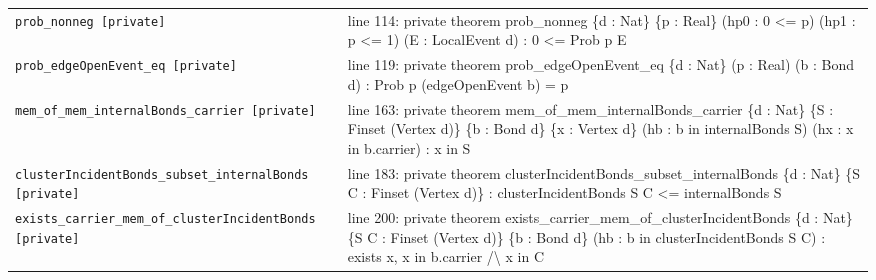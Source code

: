 \documentclass[10pt]{article}
\begin{document}
\begin{longtable}{>{\raggedright\arraybackslash}p{} >{\raggedright\arraybackslash}p{}}
\texttt{prob\_\allowbreak{}nonneg [private]} & {\ttfamily\scriptsize line 114:\allowbreak{} private theorem prob\_\allowbreak{}nonneg \{d :\allowbreak{} Nat\} \{p :\allowbreak{} Real\} (\allowbreak{}hp0 :\allowbreak{} 0 <=\allowbreak{} p)\allowbreak{} (\allowbreak{}hp1 :\allowbreak{} p <=\allowbreak{} 1)\allowbreak{} (\allowbreak{}E :\allowbreak{} LocalEvent d)\allowbreak{} :\allowbreak{} 0 <=\allowbreak{} Prob p E} \\[0.45em]
\texttt{prob\_\allowbreak{}edgeOpenEvent\_\allowbreak{}eq [private]} & {\ttfamily\scriptsize line 119:\allowbreak{} private theorem prob\_\allowbreak{}edgeOpenEvent\_\allowbreak{}eq \{d :\allowbreak{} Nat\} (\allowbreak{}p :\allowbreak{} Real)\allowbreak{} (\allowbreak{}b :\allowbreak{} Bond d)\allowbreak{} :\allowbreak{} Prob p (\allowbreak{}edgeOpenEvent b)\allowbreak{} =\allowbreak{} p} \\[0.45em]
\texttt{mem\_\allowbreak{}of\_\allowbreak{}mem\_\allowbreak{}internalBonds\_\allowbreak{}carrier [private]} & {\ttfamily\scriptsize line 163:\allowbreak{} private theorem mem\_\allowbreak{}of\_\allowbreak{}mem\_\allowbreak{}internalBonds\_\allowbreak{}carrier \{d :\allowbreak{} Nat\} \{S :\allowbreak{} Finset (\allowbreak{}Vertex d)\allowbreak{}\} \{b :\allowbreak{} Bond d\} \{x :\allowbreak{} Vertex d\} (\allowbreak{}hb :\allowbreak{} b in internalBonds S)\allowbreak{} (\allowbreak{}hx :\allowbreak{} x in b.\allowbreak{}carrier)\allowbreak{} :\allowbreak{} x in S} \\[0.45em]
\texttt{clusterIncidentBonds\_\allowbreak{}subset\_\allowbreak{}internalBonds [private]} & {\ttfamily\scriptsize line 183:\allowbreak{} private theorem clusterIncidentBonds\_\allowbreak{}subset\_\allowbreak{}internalBonds \{d :\allowbreak{} Nat\} \{S C :\allowbreak{} Finset (\allowbreak{}Vertex d)\allowbreak{}\} :\allowbreak{} clusterIncidentBonds S C <=\allowbreak{} internalBonds S} \\[0.45em]
\texttt{exists\_\allowbreak{}carrier\_\allowbreak{}mem\_\allowbreak{}of\_\allowbreak{}clusterIncidentBonds [private]} & {\ttfamily\scriptsize line 200:\allowbreak{} private theorem exists\_\allowbreak{}carrier\_\allowbreak{}mem\_\allowbreak{}of\_\allowbreak{}clusterIncidentBonds \{d :\allowbreak{} Nat\} \{S C :\allowbreak{} Finset (\allowbreak{}Vertex d)\allowbreak{}\} \{b :\allowbreak{} Bond d\} (\allowbreak{}hb :\allowbreak{} b in clusterIncidentBonds S C)\allowbreak{} :\allowbreak{} exists x,\allowbreak{} x in b.\allowbreak{}carrier /\allowbreak{}\textbackslash{} x in C} \\[0.45em]

\end{longtable}
\end{document}
